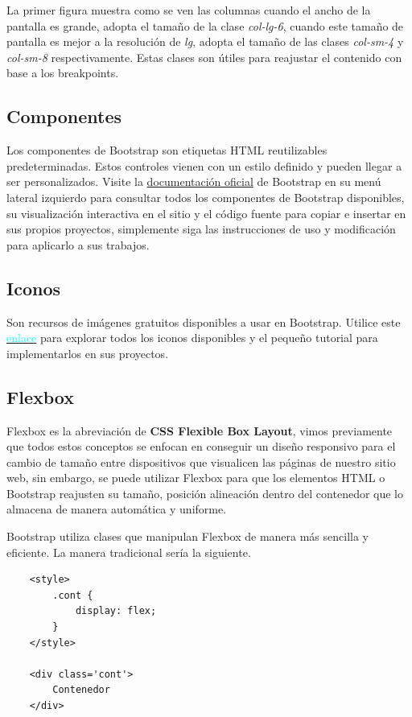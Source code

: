 La primer figura muestra como se ven las columnas cuando el ancho de la pantalla es grande, adopta el tamaño de la clase \textit{col-lg-6}, cuando este tamaño de pantalla es mejor a la resolución de \textit{lg}, adopta el tamaño de las clases \textit{col-sm-4} y \textit{col-sm-8} respectivamente. Estas clases son útiles para reajustar el contenido con base a los breakpoints.



\subsection{Componentes}

Los componentes de Bootstrap son etiquetas HTML reutilizables predeterminadas. Estos controles vienen con un estilo definido y pueden llegar a ser personalizados. Visite la \href{https://getbootstrap.com/docs/5.3/components/accordion/}{documentación oficial} de Bootstrap en su menú lateral izquierdo para consultar todos los componentes de Bootstrap disponibles, su visualización interactiva en el sitio y el código fuente para copiar e insertar en sus propios proyectos, simplemente siga las instrucciones de uso y modificación para aplicarlo a sus trabajos.


\subsection{Iconos}

Son recursos de imágenes gratuitos disponibles a usar en Bootstrap. Utilice este \href{https://icons.getbootstrap.com/}{\textcolor{cyan}{enlace}} para explorar todos los iconos disponibles y el pequeño tutorial para implementarlos en sus proyectos.


\subsection{Flexbox}

Flexbox es la abreviación de \textbf{CSS Flexible Box Layout}, vimos previamente que todos estos conceptos se enfocan en conseguir un diseño responsivo para el cambio de tamaño entre dispositivos que visualicen las páginas de nuestro sitio web, sin embargo, se puede utilizar Flexbox para que los elementos HTML o Bootstrap reajusten su tamaño, posición alineación dentro del contenedor que lo almacena de manera automática y uniforme.

Bootstrap utiliza clases que manipulan Flexbox de manera más sencilla y eficiente. La manera tradicional sería la siguiente.
\begin{lstlisting}
    <style>
        .cont {
            display: flex;
        }
    </style>
    
    <div class='cont'>
        Contenedor
    </div>
\end{lstlisting}

